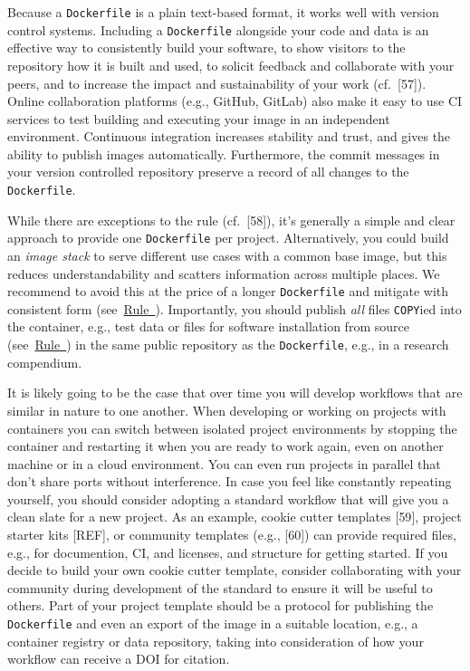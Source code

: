 \documentclass[10pt,letterpaper]{article}
\begin{document}
Because a \texttt{Dockerfile} is a plain text-based format, it works
well with version control systems. Including a \texttt{Dockerfile}
alongside your code and data is an effective way to consistently build
your software, to show visitors to the repository how it is built and
used, to solicit feedback and collaborate with your peers, and to
increase the impact and sustainability of your work (cf.~{[}57{]}).
Online collaboration platforms (e.g., GitHub, GitLab) also make it easy
to use CI services to test building and executing your image in an
independent environment. Continuous integration increases stability and
trust, and gives the ability to publish images automatically.
Furthermore, the commit messages in your version controlled repository
preserve a record of all changes to the \texttt{Dockerfile}.

While there are exceptions to the rule (cf.~{[}58{]}), it's generally a
simple and clear approach to provide one \texttt{Dockerfile} per
project. Alternatively, you could build an \emph{image stack} to serve
different use cases with a common base image, but this reduces
understandability and scatters information across multiple places. We
recommend to avoid this at the price of a longer \texttt{Dockerfile} and
mitigate with consistent form
(see~\hyperref[{rule:formatting}]{Rule~}).
Importantly, you should publish \emph{all} files \texttt{COPY}ied into
the container, e.g., test data or files for software installation from
source (see~\hyperref[{rule:mount}]{Rule~}) in the
same public repository as the \texttt{Dockerfile}, e.g., in a research
compendium.

It is likely going to be the case that over time you will develop
workflows that are similar in nature to one another. When developing or
working on projects with containers you can switch between isolated
project environments by stopping the container and restarting it when
you are ready to work again, even on another machine or in a cloud
environment. You can even run projects in parallel that don't share
ports without interference. In case you feel like constantly repeating
yourself, you should consider adopting a standard workflow that will
give you a clean slate for a new project. As an example, cookie cutter
templates {[}59{]}, project starter kits {[}REF{]}, or community
templates (e.g., {[}60{]}) can provide required files, e.g., for
documention, CI, and licenses, and structure for getting started. If you
decide to build your own cookie cutter template, consider collaborating
with your community during development of the standard to ensure it will
be useful to others. Part of your project template should be a protocol
for publishing the \texttt{Dockerfile} and even an export of the image
in a suitable location, e.g., a container registry or data repository,
taking into consideration of how your workflow can receive a DOI for
citation.
\end{document}
